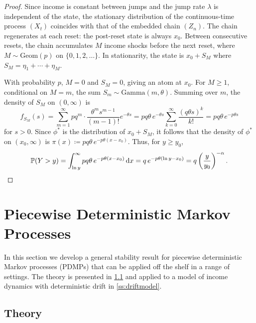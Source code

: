 \documentclass[12pt,reqno]{amsart}
\numberwithin{equation}{section}
\theoremstyle{definition}
\newcommand{\1}{\mathbbm{1}}
\newcommand{\diff}{\mathop{}\!\mathrm{d}}
\newcommand{\PP}{\mathbb P}
\newcommand{\lam}{\lambda}
\begin{document}
\begin{proof}
    Since income is constant between jumps and the jump rate $\lam$ is
    independent of the state, the stationary distribution of the continuous-time
    process $(X_t)$ coincides with that of the embedded chain $(Z_n)$.  The
    chain regenerates at each reset: the post-reset state is always $x_0$.
    Between consecutive resets, the chain accumulates $M$ income shocks before
    the next reset, where $M \sim \mathrm{Geom}(p)$ on $\{0, 1, 2, \ldots\}$.
    In stationarity, the state is $x_0 + S_M$ where $S_M = \eta_1 + \cdots +
    \eta_M$.

    With probability $p$, $M = 0$ and $S_M = 0$, giving an atom at $x_0$.  For
    $M \geq 1$, conditional on $M = m$, the sum $S_m \sim
    \mathrm{Gamma}(m, \theta)$.  Summing over $m$, the density of $S_M$ on
    $(0, \infty)$ is
    \begin{equation*}
        f_{S_M}(s)
        = \sum_{m=1}^{\infty} p q^m
          \cdot \frac{\theta^m s^{m-1}}{(m-1)!} e^{-\theta s}
        = pq\theta \, e^{-\theta s}
          \sum_{k=0}^{\infty} \frac{(q\theta s)^k}{k!}
        = pq\theta \, e^{-p\theta s}
    \end{equation*}
    for $s > 0$.  Since $\phi^*$ is the distribution of $x_0 + S_M$, it follows
    that the density of $\phi^*$ on $(x_0, \infty)$ is 
    $\pi(x) \coloneq pq\theta \, e^{-p\theta(x - x_0)}$. Thus,  for $y \geq y_0$,
    \begin{equation*}
        \PP(Y > y)
        = \int_{\ln y}^{\infty} pq\theta \, e^{-p\theta(x - x_0)} \diff x
        = q \, e^{-p\theta(\ln y - x_0)}
        = q \left(\frac{y}{y_0}\right)^{-\alpha}. \qedhere
    \end{equation*}
\end{proof}



\section{Piecewise Deterministic Markov Processes}\label{s:pdmp}

In this section we develop a general stability result for piecewise
deterministic Markov processes (PDMPs) that can be applied off the shelf
in a range of settings. The theory is presented in \cref{ss:pdmptheory}
and applied to a model of income dynamics with deterministic drift in
\cref{ss:driftmodel}.


\subsection{Theory}\label{ss:pdmptheory}
\end{document}
